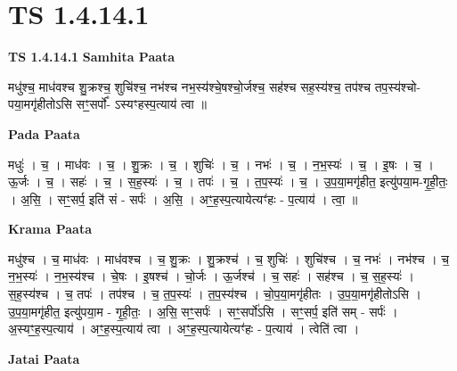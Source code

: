 \documentclass[17pt]{extarticle}
\begin{document}
\section*{ TS 1.4.14.1 }

\textbf{TS 1.4.14.1 } \newline
\textbf{Samhita Paata} \newline

मधु॑श्च॒ माध॑वश्च शु॒क्रश्च॒ शुचि॑श्च॒ नभ॑श्च नभ॒स्य॑श्चे॒षश्चो॒र्जश्च॒ सह॑श्च सह॒स्य॑श्च॒ तप॑श्च तप॒स्य॑श्चो-पया॒मगृ॑हीतोऽसि सꣳ॒॒सर्पो᳚- ऽस्यꣳहस्प॒त्याय॑ त्वा ॥ \newline

\textbf{Pada Paata} \newline

मधुः॑ । च॒ । माध॑वः । च॒ । शु॒क्रः । च॒ । शुचिः॑ । च॒ । नभः॑ । च॒ । न॒भ॒स्यः॑ । च॒ । इ॒षः । च॒ । ऊ॒र्जः । च॒ । सहः॑ । च॒ । स॒ह॒स्यः॑ । च॒ । तपः॑ । च॒ । त॒प॒स्यः॑ । च॒ । उ॒प॒या॒मगृ॑हीत॒ इत्यु॑पया॒म-गृ॒ही॒तः॒ । अ॒सि॒ । सꣳ॒॒सर्प॒ इति॑ सं - सर्पः॑ । अ॒सि॒ । अꣳ॒॒ह॒स्प॒त्यायेत्यꣳ॑हः - प॒त्याय॑ । त्वा॒ ॥  \newline


\textbf{Krama Paata} \newline

मधु॑श्च । च॒ माध॑वः । माध॑वश्च । च॒ शु॒क्रः । शु॒क्रश्च॑ । च॒ शुचिः॑ । शुचि॑श्च । च॒ नभः॑ । नभ॑श्च । च॒ न॒भ॒स्यः॑ । न॒भ॒स्य॑श्च । चे॒षः । इ॒षश्च॑ । चो॒र्जः । ऊ॒र्जश्च॑ । च॒ सहः॑ । सह॑श्च । च॒ स॒ह॒स्यः॑ । स॒ह॒स्य॑श्च । च॒ तपः॑ । तप॑श्च । च॒ त॒प॒स्यः॑ । त॒प॒स्य॑श्च । चो॒प॒या॒मगृ॑हीतः । उ॒प॒या॒मगृ॑हीतोऽसि । उ॒प॒या॒मगृ॑हीत॒ इत्यु॑पया॒म - गृ॒ही॒तः॒ । अ॒सि॒ सꣳ॒॒सर्पः॑ । सꣳ॒॒सर्पो॑ऽसि । सꣳ॒॒सर्प॒ इति॑ सम् - सर्पः॑ । अ॒स्यꣳ॒॒ह॒स्प॒त्याय॑ । अꣳ॒॒ह॒स्प॒त्याय॑ त्वा । अꣳ॒॒ह॒स्प॒त्यायेत्यꣳ॑हः - प॒त्याय॑ । त्वेति॑ त्वा । \newline

\textbf{Jatai Paata} \newline
\end{document}

